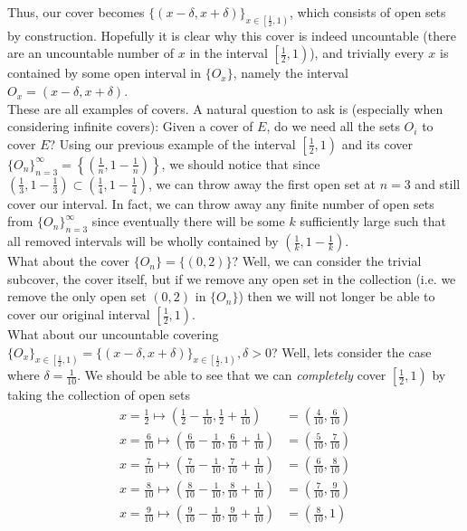\documentclass[12pt]{article}
\newlength\tindent
\renewcommand{\indent}{\hspace*{\tindent}}
\begin{document}
\indent Thus, our cover becomes $\{ (x - \delta, x + \delta) \}_{x \in \left[ \frac{1}{2}, 1 \right)}$, which consists of open sets by construction. Hopefully it is clear why this cover is indeed uncountable (there are an uncountable number of $x$ in the interval $\left[\frac{1}{2}, 1\right)$), and trivially every $x$ is contained by some open interval in $\{O_x\}$, namely the interval $O_x = (x - \delta, x + \delta)$. \\

\indent These are all examples of covers. A natural question to ask is (especially when considering infinite covers): Given a cover of $E$, do we need all the sets $O_i$ to cover $E$? Using our previous example of the interval $\left[ \frac{1}{2}, 1 \right)$ and its cover $\{O_n\}^\infty_{n=3} = \left\{\left(\frac{1}{n}, 1 - \frac{1}{n}\right)\right\}$, we should notice that since $\left(\frac{1}{3}, 1 - \frac{1}{3}\right) \subset \left(\frac{1}{4}, 1 - \frac{1}{4}\right)$, we can throw away the first open set at $n = 3$ and still cover our interval. In fact, we can throw away any finite number of open sets from $\{O_n\}^\infty_{n = 3}$ since eventually there will be some $k$ sufficiently large such that all removed intervals will be wholly contained by $\left(\frac{1}{k}, 1 - \frac{1}{k}\right)$. \\

\indent What about the cover $\{O_n\} = \{(0, 2)\}$? Well, we can consider the trivial subcover, the cover itself, but if we remove any open set in the collection (i.e. we remove the only open set $(0, 2)$ in $\{O_n\}$) then we will not longer be able to cover our original interval $\left[\frac{1}{2},1\right)$. \\

\indent What about our uncountable covering $\{O_x\}_{x\in\left[\frac{1}{2},1\right)} = \{(x - \delta, x + \delta)\}_{x\in\left[\frac{1}{2},1\right)}, \delta > 0$? Well, lets consider the case where $\delta = \frac{1}{10}$. We should be able to see that we can {\em completely} cover $\left[ \frac{1}{2},1\right)$ by taking the collection of open sets
\begin{align*}
	x = \frac{1}{2} \mapsto \left(\frac{1}{2} - \frac{1}{10}, \frac{1}{2} + \frac{1}{10}\right) &= \left(\frac{4}{10}, \frac{6}{10}\right) \\
	x = \frac{6}{10} \mapsto \left(\frac{6}{10} - \frac{1}{10}, \frac{6}{10} + \frac{1}{10}\right) &= \left(\frac{5}{10}, \frac{7}{10}\right) \\
	x = \frac{7}{10} \mapsto \left(\frac{7}{10} - \frac{1}{10}, \frac{7}{10} + \frac{1}{10}\right) &= \left(\frac{6}{10}, \frac{8}{10}\right) \\
	x = \frac{8}{10} \mapsto \left(\frac{8}{10} - \frac{1}{10}, \frac{8}{10} + \frac{1}{10}\right) &= \left(\frac{7}{10}, \frac{9}{10}\right) \\
	x = \frac{9}{10} \mapsto \left(\frac{9}{10} - \frac{1}{10}, \frac{9}{10} + \frac{1}{10}\right) &= \left(\frac{8}{10}, 1\right) \\	
\end{align*}
\end{document}
